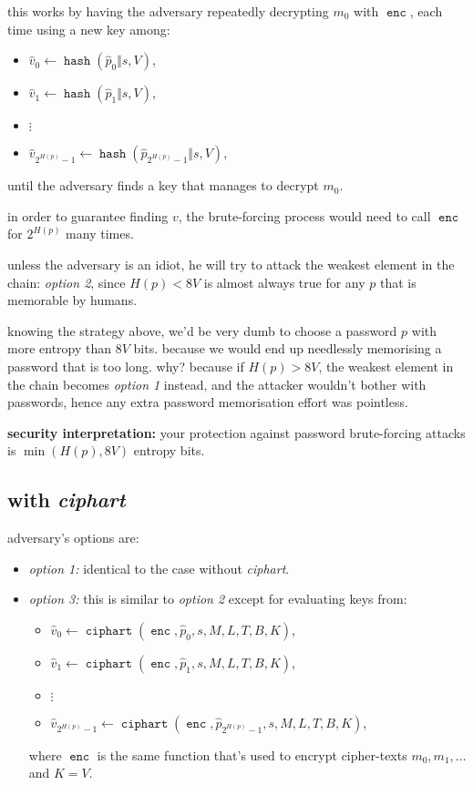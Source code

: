 \documentclass[twocolumn]{article}
\DeclareMathOperator{\enc}{\texttt{enc}}
\DeclareMathOperator{\hash}{\texttt{hash}}
\DeclareMathOperator{\kdf}{\texttt{ciphart}}
\begin{document}
\begin{itemize}
    this works by having the adversary repeatedly decrypting $m_0$ with
    $\enc$, each time using a new key among:
    \begin{itemize}
        \item $\hat v_0 \gets \hash(\hat p_0 \Vert s, V)$,
        \item $\hat v_1 \gets \hash(\hat p_1 \Vert s, V)$,
        \item $\vdots$
        \item $\hat v_{2^{H(p)}-1} \gets \hash(\hat p_{2^{H(p)}-1} \Vert s,
        V)$,
    \end{itemize}
    until the adversary finds a key that manages to decrypt $m_0$.

    in order to guarantee finding $v$, the brute-forcing process would need
    to call $\enc$ for $2^{H(p)}$ many times.
\end{itemize}

unless the adversary is an idiot, he will try to attack the weakest element
in the chain: \emph{option 2}, since $H(p) < 8V$ is almost always true for
any $p$ that is memorable by humans.

knowing the strategy above, we'd be very dumb to choose a password $p$ with
more entropy than $8V$ bits.  because we would end up needlessly memorising
a password that is too long.  why?  because if $H(p) > 8V$, the weakest
element in the chain becomes \emph{option 1} instead, and the attacker
wouldn't bother with passwords, hence any extra password memorisation
effort was pointless.

\textbf{security interpretation:}  your protection against password
brute-forcing attacks is $\min(H(p), 8V)$ entropy bits.

\subsection{with \emph{ciphart}}
adversary's options are:
\begin{itemize}
    \item \emph{option 1:} identical to the case without \emph{ciphart}.
    \item \emph{option 3:} this is similar to \emph{option 2} except for
    evaluating keys from:
    \begin{itemize}
        \item $\hat v_0 \gets \kdf(\enc, \hat p_0, s, M, L, T, B, K)$,
        \item $\hat v_1 \gets \kdf(\enc, \hat p_1, s, M, L, T, B, K)$,
        \item $\vdots$
        \item $\hat v_{2^{H(p)}-1} \gets \kdf(\enc, \hat p_{2^{H(p)}-1}, s, M,
        L, T, B, K)$,
    \end{itemize}
    where $\enc$ is the same function that's used to encrypt cipher-texts $m_0,
    m_1, \ldots$ and $K = V$.
\end{itemize}
\end{document}
